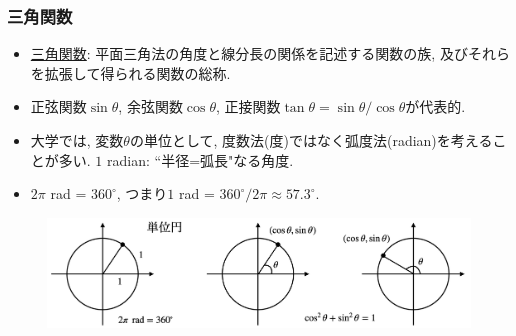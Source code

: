 \begin{frame}
\frametitle{三角関数}

\begin{itemize}
\item 
\underline{三角関数}: 平面三角法の角度と線分長の関係を記述する関数の族, 及びそれらを拡張して得られる関数の総称. 
\item 正弦関数$\sin \theta$, 余弦関数$\cos \theta$, 正接関数$\tan \theta= \sin \theta / \cos \theta$が代表的. 
\item 大学では, 変数$\theta$の単位として, 度数法(度)ではなく弧度法(radian)を考えることが多い. 
$1$ radian: ``半径=弧長"なる角度. 
\item $2\pi$ rad = $360^\circ$, つまり$1$ rad =  $360^\circ/2 \pi \approx 57.3 ^\circ$. 
\end{itemize}

\vspace{-2mm}

\begin{figure}[htbp]
 \begin{center} 
  \includegraphics[width=115mm]{calculus2/radian.png}
 \end{center}
\end{figure}
\vspace{-2mm}

\end{frame}








